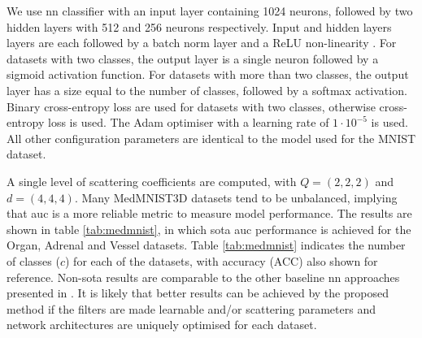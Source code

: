 We use \ac{nn} classifier with an input layer containing 1024 neurons, followed by two hidden layers with 512 and 256 neurons respectively. Input and hidden layers layers are each followed by a batch norm layer \cite{batchnorm} and a ReLU non-linearity \cite{relu}. For datasets with two classes, the output layer is a single neuron followed by a sigmoid activation function. For datasets with more than two classes, the output layer has a size equal to the number of classes, followed by a softmax activation. Binary cross-entropy loss are used for datasets with two classes, otherwise cross-entropy loss is used. The Adam optimiser \cite{adam} with a learning rate of $1 \cdot 10^{-5}$ is used. All other configuration parameters are identical to the model used for the MNIST dataset.

A single level of scattering coefficients are computed, with $Q = (2, 2, 2)$ and $d = (4, 4, 4)$. Many MedMNIST3D datasets tend to be unbalanced, implying that \ac{auc} is a more reliable metric to measure model performance. The results are shown in table \ref{tab:medmnist}, in which \ac{sota} \ac{auc} performance is achieved for the Organ, Adrenal and Vessel datasets. Table \ref{tab:medmnist} indicates the number of classes ($c$) for each of the datasets, with accuracy (ACC) also shown for reference. Non-\ac{sota} results are comparable to the other baseline \ac{nn} approaches presented in \cite{medmnist}. It is likely that better results can be achieved by the proposed method if the filters are made learnable and/or scattering parameters and network architectures are uniquely optimised for each dataset.


